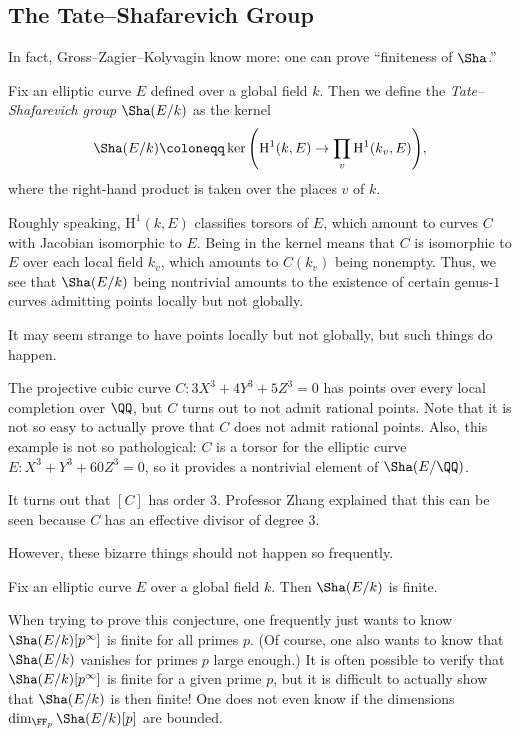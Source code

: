 \documentclass[../notes.tex]{subfiles}
\begin{document}
\subsection{The Tate--Shafarevich Group}
In fact, Gross--Zagier--Kolyvagin know more: one can prove ``finiteness of $\Sha$.''
\begin{definition}
	Fix an elliptic curve $E$ defined over a global field $k$. Then we define the \textit{Tate--Shafarevich group} $\Sha(E/k)$ as the kernel
	\[\Sha(E/k)\coloneqq\ker\Bigg(\mathrm H^1(k,E)\to\prod_v\mathrm H^1(k_v,E)\Bigg),\]
	where the right-hand product is taken over the places $v$ of $k$.
\end{definition}
\begin{remark}
	Roughly speaking, $\mathrm H^1(k,E)$ classifies torsors of $E$, which amount to curves $C$ with Jacobian isomorphic to $E$. Being in the kernel means that $C$ is isomorphic to $E$ over each local field $k_v$, which amounts to $C(k_v)$ being nonempty. Thus, we see that $\Sha(E/k)$ being nontrivial amounts to the existence of certain genus-$1$ curves admitting points locally but not globally.
\end{remark}
It may seem strange to have points locally but not globally, but such things do happen.
\begin{example}
	The projective cubic curve $C\colon 3X^3+4Y^3+5Z^3=0$ has points over every local completion over $\QQ$, but $C$ turns out to not admit rational points. Note that it is not so easy to actually prove that $C$ does not admit rational points. Also, this example is not so pathological: $C$ is a torsor for the elliptic curve $E\colon X^3+Y^3+60Z^3=0$, so it provides a nontrivial element of $\Sha(E/\QQ)$.
\end{example}
\begin{remark}
	It turns out that $[C]$ has order $3$. Professor Zhang explained that this can be seen because $C$ has an effective divisor of degree $3$.
\end{remark}
However, these bizarre things should not happen so frequently.
\begin{conj}
	Fix an elliptic curve $E$ over a global field $k$. Then $\Sha(E/k)$ is finite.
\end{conj}
\begin{remark}
	When trying to prove this conjecture, one frequently just wants to know $\Sha(E/k)[p^\infty]$ is finite for all primes $p$. (Of course, one also wants to know that $\Sha(E/k)$ vanishes for primes $p$ large enough.) It is often possible to verify that $\Sha(E/k)[p^\infty]$ is finite for a given prime $p$, but it is difficult to actually show that $\Sha(E/k)$ is then finite! One does not even know if the dimensions $\dim_{\FF_p}\Sha(E/k)[p]$ are bounded.
\end{remark}
\end{document}

